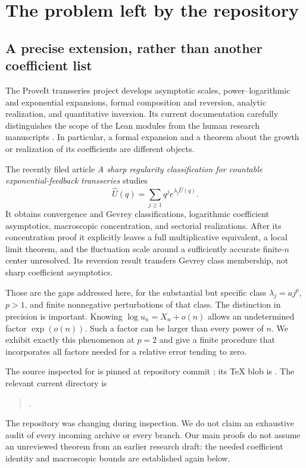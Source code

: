 \documentclass[11pt,a4paper]{article}
\numberwithin{equation}{section}
\theoremstyle{definition}
\theoremstyle{remark}
\newcommand{\Uhat}{\widehat U}\newcommand{\Vhat}{\widehat V}
\begin{document}
\clearpage
\setcounter{tocdepth}{1}\hypersetup{bookmarksdepth=2}
\tableofcontents
\clearpage

\section{The problem left by the repository}
\label{sec:context}

\subsection{A precise extension, rather than another coefficient list}

The ProveIt transseries project develops asymptotic scales, power--logarithmic
and exponential expansions, formal composition and reversion, analytic
realization, and quantitative inversion. Its current documentation carefully
distinguishes the scope of the Lean modules from the human research
manuscripts \cite{repo}. In particular, a formal expansion and a theorem
about the growth or realization of its coefficients are different objects.

The recently filed article \emph{A sharp regularity classification for
countable exponential-feedback transseries} \cite{feedback} studies
\[
 \Uhat(q)=\sum_{j\ge1}q^j e^{\lambda_j\Uhat(q)}.
\]
It obtains convergence and Gevrey classifications, logarithmic coefficient
asymptotics, macroscopic concentration, and sectorial realizations. After its
concentration proof it explicitly leaves a full multiplicative equivalent,
a local limit theorem, and the fluctuation scale around a sufficiently
accurate finite-$n$ center unresolved. Its reversion result transfers Gevrey
class membership, not sharp coefficient asymptotics.

Those are the gaps addressed here, for the substantial but specific class
$\lambda_j=a j^p$, $p>1$, and finite nonnegative perturbations of that class.
The distinction in precision is important. Knowing
$\log u_n=X_n+o(n)$ allows an undetermined factor
$\exp(o(n))$. Such a factor can be larger than every power of $n$.
We exhibit exactly this phenomenon at $p=2$ and give a finite procedure
that incorporates all factors needed for a relative error tending to zero.

The source inspected for \cite{feedback} is pinned at repository commit
; its TeX blob is
.
The relevant current directory is
\begin{quote}\small
{}.
\end{quote}
The repository was changing during inspection. We do not claim an exhaustive
audit of every incoming archive or every branch. Our main proofs do not
assume an unreviewed theorem from an earlier research draft: the needed
coefficient identity and macroscopic bounds are established again below.
\end{document}
